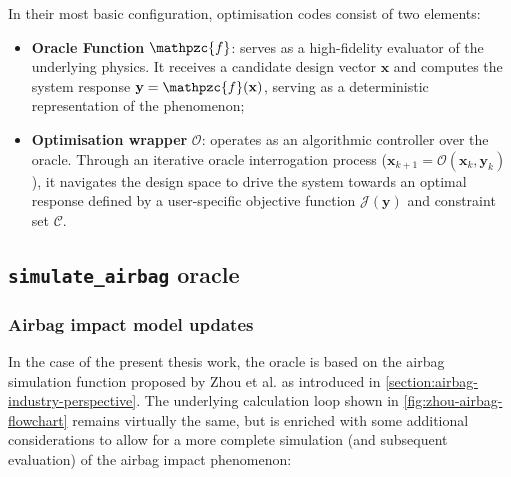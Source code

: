 In their most basic configuration, optimisation codes consist of two elements:
\begin{itemize}
  \item \textbf{Oracle Function} $\mathpzc{f}$: serves as a high-fidelity evaluator of the underlying physics. It receives a candidate design vector $\mathbf{x}$ and computes the system response $\mathbf{y} = \mathpzc{f}(\mathbf{x})$, serving as a deterministic representation of the phenomenon;
  \item \textbf{Optimisation wrapper} $\mathcal{O}$: operates as an algorithmic controller over the oracle. Through an iterative oracle interrogation process ($\mathbf{x}_{k+1} = \mathcal{O}(\mathbf{x}_k, \mathbf{y}_k)$), it navigates the design space to drive the system towards an optimal response defined by a user-specific objective function $\mathcal{J}(\mathbf{y})$ and constraint set $\mathcal{C}$.
\end{itemize}

\subsection{\texttt{simulate\_airbag} oracle}\label{sec:simulate-airbag-oracle}
\subsubsection{Airbag impact model updates}
In the case of the present thesis work, the oracle is based on the airbag simulation function proposed by Zhou et al. \cite{Zhou2019} as introduced in \cref{section:airbag-industry-perspective}. The underlying calculation loop shown in \cref{fig:zhou-airbag-flowchart} remains virtually the same, but is enriched with some additional considerations to allow for a more complete simulation (and subsequent evaluation) of the airbag impact phenomenon:

